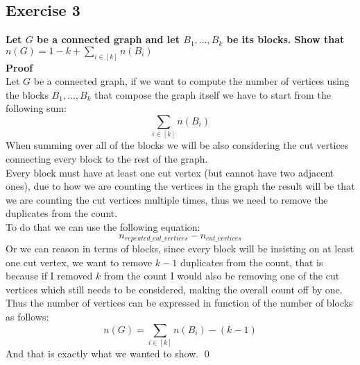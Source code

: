 \subsection*{Exercise 3}
\textbf{Let $G$ be a connected graph and let $B_1, \dots, B_k$ be its blocks. Show that $n(G) = 1 - k + \sum_{i \in [k]}n(B_i)$\\\linebreak Proof\\}
\unboldmath
Let $G$ be a connected graph, if we want to compute the number of vertices using the blocks $B_1, \dots, B_k$ that compose the graph itself we have to start from the following sum:
\begin{equation*}
    \sum_{i \in [k]}n(B_i)
\end{equation*}
When summing over all of the blocks we will be also considering the cut vertices connecting every block to the rest of the graph.\\\linebreak
Every block must have at least one cut vertex (but cannot have two adjacent ones), due to how we are counting the vertices in the graph the result will be that we are counting the cut vertices multiple times, thus we need to remove the duplicates from the count.\\
To do that we can use the following equation:
\begin{equation*}
    n_{repeated\_cut\_vertices} - n_{cut\_vertices}
\end{equation*}
Or we can reason in terms of blocks, since every block will be insisting on at least one cut vertex, we want to remove $k - 1$ duplicates from the count, that is because if I removed $k$ from the count I would also be removing one of the cut vertices which still needs to be considered, making the overall count off by one.\\\linebreak
Thus the number of vertices can be expressed in function of the number of blocks as follows:
\begin{equation*}
    n(G) = \sum_{i \in [k]}n(B_i) - (k - 1)
\end{equation*}
And that is exactly what we wanted to show. \qed